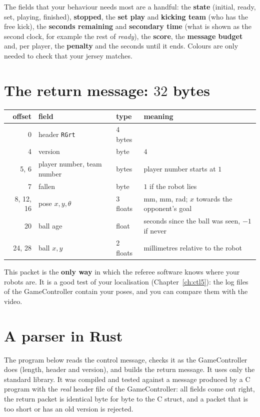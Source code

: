 The fields that your behaviour needs most are a handful: the \textbf{state} (initial, ready, set, playing, finished), \textbf{stopped}, the \textbf{set play} and \textbf{kicking team} (who has the free kick), the \textbf{seconds remaining} and \textbf{secondary time} (what is shown as the second clock, for example the rest of \emph{ready}), the \textbf{score}, the \textbf{message budget} and, per player, the \textbf{penalty} and the seconds until it ends. Colours are only needed to check that your jersey matches.

\section*{The return message: $32$ bytes}
\begin{center}
\small
\begin{tabular}{rlll}
\hline
offset & field & type & meaning\\
\hline
0 & header \texttt{RGrt} & 4 bytes & \\
4 & version & byte & $4$\\
5, 6 & player number, team number & bytes & player number starts at $1$\\
7 & fallen & byte & $1$ if the robot lies\\
8, 12, 16 & pose $x,y,\theta$ & 3 floats & mm, mm, rad; $x$ towards the opponent's goal\\
20 & ball age & float & seconds since the ball was seen, $-1$ if never\\
24, 28 & ball $x,y$ & 2 floats & millimetres relative to the robot\\
\hline
\end{tabular}
\end{center}
This packet is the \textbf{only way} in which the referee software knows where your robots are. It is a good test of your localisation (Chapter~\ref{ch:ctl5}): the log files of the GameController contain your poses, and you can compare them with the video.

\section*{A parser in Rust}
The program below reads the control message, checks it as the GameController does (length, header and version), and builds the return message. It uses only the standard library. It was compiled and tested against a message produced by a C program with the \emph{real} header file of the GameController: all fields come out right, the return packet is identical byte for byte to the C struct, and a packet that is too short or has an old version is rejected.


